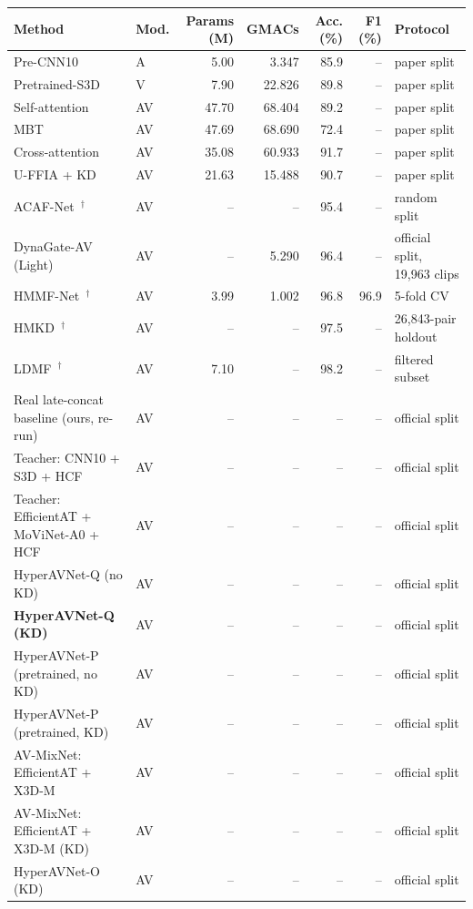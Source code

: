 \begin{tabular}{llrrrrl}
\toprule
Method & Mod. & Params (M) & GMACs & Acc. (\%) & F1 (\%) & Protocol \\
\midrule
Pre-CNN10~\cite{cui2024uffia} & A & 5.00 & 3.347 & 85.9 & -- & paper split \\
Pretrained-S3D~\cite{cui2024uffia} & V & 7.90 & 22.826 & 89.8 & -- & paper split \\
Self-attention~\cite{cui2024uffia} & AV & 47.70 & 68.404 & 89.2 & -- & paper split \\
MBT~\cite{cui2024uffia} & AV & 47.69 & 68.690 & 72.4 & -- & paper split \\
Cross-attention~\cite{cui2024uffia} & AV & 35.08 & 60.933 & 91.7 & -- & paper split \\
U-FFIA + KD~\cite{cui2024uffia} & AV & 21.63 & 15.488 & 90.7 & -- & paper split \\
\midrule
ACAF-Net~\cite{acafnet2025}$^\dagger$ & AV & -- & -- & 95.4 & -- & random split \\
DynaGate-AV (Light)~\cite{dynagate2026} & AV & -- & 5.290 & 96.4 & -- & official split, 19,963 clips \\
HMMF-Net~\cite{hmmfnet2026}$^\dagger$ & AV & 3.99 & 1.002 & 96.8 & 96.9 & 5-fold CV \\
HMKD~\cite{hmkd2026}$^\dagger$ & AV & -- & -- & 97.5 & -- & 26,843-pair holdout \\
LDMF~\cite{ldmf2026}$^\dagger$ & AV & 7.10 & -- & 98.2 & -- & filtered subset \\
\midrule
Real late-concat baseline (ours, re-run) & AV & -- & -- & -- & -- & official split \\
Teacher: CNN10 + S3D + HCF & AV & -- & -- & -- & -- & official split \\
Teacher: EfficientAT + MoViNet-A0 + HCF & AV & -- & -- & -- & -- & official split \\
HyperAVNet-Q (no KD) & AV & -- & -- & -- & -- & official split \\
\textbf{HyperAVNet-Q (KD)} & AV & -- & -- & -- & -- & official split \\
HyperAVNet-P (pretrained, no KD) & AV & -- & -- & -- & -- & official split \\
HyperAVNet-P (pretrained, KD) & AV & -- & -- & -- & -- & official split \\
AV-MixNet: EfficientAT + X3D-M & AV & -- & -- & -- & -- & official split \\
AV-MixNet: EfficientAT + X3D-M (KD) & AV & -- & -- & -- & -- & official split \\
HyperAVNet-O (KD) & AV & -- & -- & -- & -- & official split \\
\bottomrule
\end{tabular}
